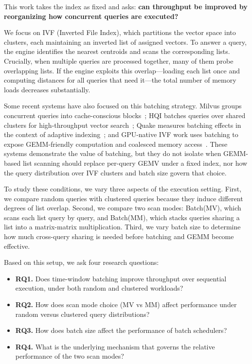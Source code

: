 \documentclass[sigconf, nonacm]{acmart}
\begin{document}
This work takes the index as fixed and asks: \textbf{can throughput be
improved by reorganizing how concurrent queries are executed?}

We focus on IVF (Inverted File Index), which partitions the vector space
into clusters, each maintaining an inverted list of assigned vectors. To
answer a query, the engine identifies the nearest centroids and scans
the corresponding lists. Crucially, when multiple queries are processed
together, many of them probe overlapping lists. If the engine exploits
this overlap---loading each list once and computing distances for all
queries that need it---the total number of memory loads decreases
substantially.

Some recent systems have also focused on this batching strategy. Milvus
groups concurrent queries into cache-conscious blocks~\cite{milvus2021};
HQI batches queries over shared clusters for high-throughput vector
search~\cite{hqi2023}; Quake measures batching effects in the context of
adaptive indexing~\cite{quake2025}; and GPU-native IVF work uses
batching to expose GEMM-friendly computation and coalesced memory
access~\cite{ivfrabitq2025}. These systems demonstrate the value of
batching, but they do not isolate when GEMM-based list scanning should
replace per-query GEMV under a fixed index, nor how the query
distribution over IVF clusters and batch size govern that choice.

To study these conditions, we vary three aspects of the execution
setting. First, we compare random queries with clustered queries because
they induce different degrees of list overlap. Second, we compare two
scan modes: Batch(MV), which scans each list query by query, and
Batch(MM), which stacks queries sharing a list into a matrix-matrix
multiplication. Third, we vary batch size to determine how much
cross-query sharing is needed before batching and GEMM become effective.

Based on this setup, we ask four research questions:

\begin{itemize}
  \item \textbf{RQ1.} Does time-window batching improve throughput over
    sequential execution, under both random and clustered workloads?
  \item \textbf{RQ2.} How does scan mode choice (MV vs MM) affect
    performance under random versus clustered query distributions?
  \item \textbf{RQ3.} How does batch size affect the performance of
    batch schedulers?
  \item \textbf{RQ4.} What is the underlying mechanism that governs the
    relative performance of the two scan modes?
\end{itemize}
\end{document}
